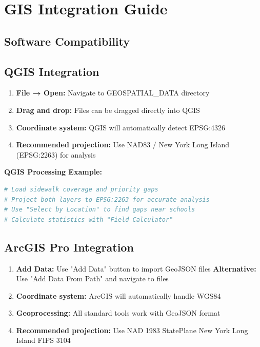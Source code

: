 \documentclass[11pt,letterpaper]{article}
\begin{document}
\section{GIS Integration Guide}

\subsection{Software Compatibility}

\subsection{QGIS Integration}
\begin{enumerate}
    \item \textbf{File → Open:} Navigate to GEOSPATIAL\_DATA directory
    \item \textbf{Drag and drop:} Files can be dragged directly into QGIS
    \item \textbf{Coordinate system:} QGIS will automatically detect EPSG:4326
    \item \textbf{Recommended projection:} Use NAD83 / New York Long Island (EPSG:2263) for analysis
\end{enumerate}

\textbf{QGIS Processing Example:}
\begin{lstlisting}[language=bash]
# Load sidewalk coverage and priority gaps
# Project both layers to EPSG:2263 for accurate analysis
# Use "Select by Location" to find gaps near schools
# Calculate statistics with "Field Calculator"
\end{lstlisting}

\subsection{ArcGIS Pro Integration}
\begin{enumerate}
    \item \textbf{Add Data:} Use "Add Data" button to import GeoJSON files
    \textbf{Alternative:} Use "Add Data From Path" and navigate to files
    \item \textbf{Coordinate system:} ArcGIS will automatically handle WGS84
    \item \textbf{Geoprocessing:} All standard tools work with GeoJSON format
    \item \textbf{Recommended projection:} Use NAD 1983 StatePlane New York Long Island FIPS 3104
\end{enumerate}
\end{document}
